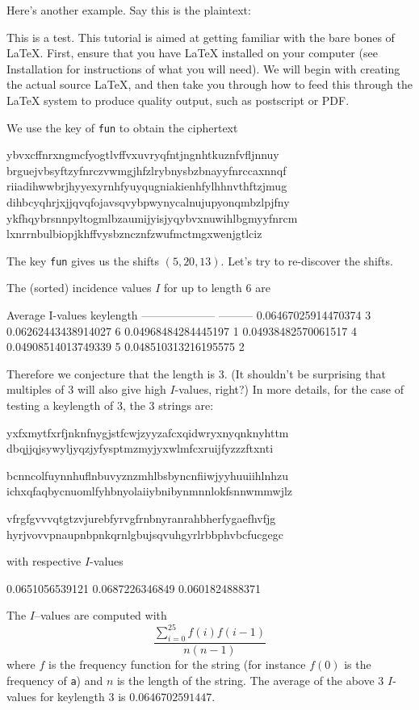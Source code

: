 Here's another example. 
Say this is the plaintext:
\begin{console}
This is a test. This tutorial is aimed at getting 
familiar with the bare bones of LaTeX. First, ensure
that you have LaTeX installed on your computer (see
Installation for instructions of what you will 
need). We will begin with creating the actual source 
LaTeX, and then take you through how to feed this 
through the LaTeX system to produce quality output, 
such as postscript or PDF.
\end{console}
We use the key of \verb!fun! to obtain the ciphertext
\begin{console}
ybvxcffnrxngmcfyogtlvffvxuvryqfntjngnhtkuznfvfljnnuy
brguejvbsyftzyfnrczvwmgjhfzlrybnysbzbnayyfnrccaxnnqf
riiadihwwbrjhyyexyrnhfyuyqugniakienhfylhhnvthftzjmug
dihbcyqhrjxjjqvqfojavsqvybpwynycalnujupyonqmbzlpjfny
ykfhqybrsnnpyltogmlbzaumijyisjyqybvxnuwihlbgmyyfnrcm
lxnrrnbulbiopjkhffvysbzncznfzwufmctmgxwenjgtlciz
\end{console}
The key \verb!fun! gives us the shifts $(5, 20, 13)$.
Let's try to re-discover the shifts.

The (sorted) incidence values $I$ for up to length 6 are
\begin{console}
Average I-values     keylength
-------------------- ---------
0.06467025914470374  3
0.06262443438914027  6
0.04968484284445197  1
0.04938482570061517  4
0.04908514013749339  5
0.048510313216195575 2
\end{console}
Therefore we conjecture that the length is 3.
(It shouldn't be surprising that multiples of 3 will
also give high $I$-values, right?)
In more details, for the case of testing a keylength of 3,
the 3 strings are:
\begin{console}
yxfxmytfxrfjnknfnygjstfcwjzyyzafcxqidwryxnyqnknyhttm
dbqjjqjsywyljyqzjyfysptmzmyjyxwlmfcxruijfyzzzftxnti

bcnncolfuynnhuflnbuvyznzmhlbsbyncnfiiwjyyhuuiihlnhzu
ichxqfaqbycnuomlfyhbnyolaiiybnibynmnnlokfsnnwmmwjlz

vfrgfgvvvqtgtzvjurebfyrvgfrnbnyranrahbherfygaefhvfjg
hyrjvovvpnaupnbpnkqrnlgbujsqvuhgyrlrbbphvbcfucgegc
\end{console}
with respective $I$-values 
\begin{console}
0.0651056539121
0.0687226346849
0.0601824888371
\end{console}
The $I$--values are computed with
\[
\frac{\sum_{i=0}^{25} f(i)f(i-1)}{n(n-1)}
\]
where $f$ is the frequency function for the string
(for instance $f(0)$ is the frequency of \verb!a!) 
and $n$ is the length of the string.
The average of the above 3 $I$-values for keylength 3 is
$0.0646702591447$.

